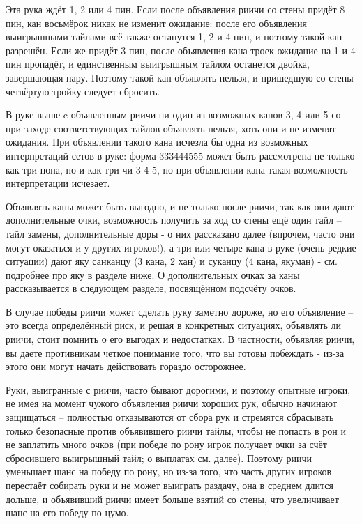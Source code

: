Эта рука ждёт 1, 2 или 4 пин. Если после объявления риичи со стены придёт 8 пин, кан восьмёрок никак не изменит ожидание: после его объявления выигрышными тайлами всё также останутся 1, 2 и 4 пин, и поэтому такой кан разрешён. Если же придёт 3 пин, после объявления кана троек ожидание на 1 и 4 пин пропадёт, и единственным выигрышным тайлом останется двойка, завершающая пару. Поэтому такой кан объявлять нельзя, и пришедшую со стены четвёртую тройку следует сбросить. 


В руке выше c объявленным риичи ни один из возможных канов 3, 4 или 5 со при заходе соответствующих тайлов объявлять нельзя, хоть они и не изменят ожидания. При объявлении такого кана исчезла бы одна из возможных интерпретаций сетов в руке: форма 333444555 может быть рассмотрена не только как три пона, но и как три чи 3-4-5, но при объявлении кана такая возможность интерпретации исчезает. 

Объявлять каны может быть выгодно, и не только после риичи, так как они дают дополнительные очки, возможность получить за ход со стены ещё один тайл – тайл замены, дополнительные доры - о них рассказано далее (впрочем, часто они могут оказаться и у других игроков!), а три или четыре кана в руке (очень редкие ситуации) дают яку санканцу (3 кана, 2 хан) и суканцу (4 кана, якуман) - см. подробнее про яку в разделе ниже. О дополнительных очках за каны рассказывается в следующем разделе, посвящённом подсчёту очков.

В случае победы риичи может сделать руку заметно дороже, но его объявление – это всегда определённый риск, и решая в конкретных ситуациях, объявлять ли риичи, стоит помнить о его выгодах и недостатках. В частности, объявляя риичи, вы даете противникам четкое понимание того, что вы готовы побеждать - из-за этого они могут начать действовать гораздо осторожнее.

Руки, выигранные с риичи, часто бывают дорогими, и поэтому опытные игроки, не имея на момент чужого объявления риичи хороших рук, обычно начинают защищаться – полностью отказываются от сбора рук и стремятся сбрасывать только безопасные против объявившего риичи тайлы, чтобы не попасть в рон и не заплатить много очков (при победе по рону игрок получает очки за счёт сбросившего выигрышный тайл; о выплатах см. далее). Поэтому риичи уменьшает шанс на победу по рону, но из-за того, что часть других игроков перестаёт собирать руки и не может выиграть раздачу, она в среднем длится дольше, и объявивший риичи имеет больше взятий со стены, что увеличивает шанс на его победу по цумо.

